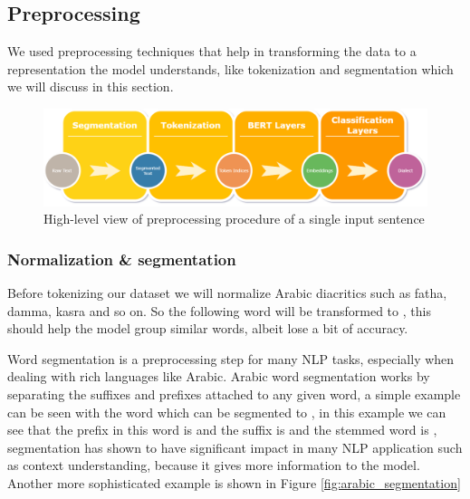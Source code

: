 \documentclass[12pt]{diazessay}
\begin{document}
        
        
            
            
            
        
        \subsection{Preprocessing}
        We used preprocessing techniques that help in transforming the data to a representation the model understands, like tokenization and segmentation which we will discuss in this section.
        
        \begin{figure}[h]
            \hskip-2.3cm
            \includegraphics[scale=0.4]{Figures/preprocessing_figure.png}
            \caption{High-level view of preprocessing procedure of a single input sentence}
            \label{fig:inference_figure}
        \end{figure}
        
            \subsubsection{Normalization \& segmentation}
            Before tokenizing our dataset we will normalize Arabic diacritics such as fatha, damma, kasra and so on. So the following word  
            will be transformed to , this should help the model group similar words, albeit lose a bit of accuracy.
            
            
            Word segmentation is a preprocessing step for many NLP tasks, especially when dealing with rich languages like Arabic. Arabic word segmentation works by separating the suffixes and prefixes attached to any given word, a simple example can be seen with the word  which can be segmented to , in this example we can see that the prefix in this word is  and the suffix is  and the stemmed word is , segmentation has shown to have signiﬁcant impact in many NLP application such as context understanding, because it gives more information to the model. Another more sophisticated example is shown in Figure \ref{fig:arabic_segmentation}
            
\end{document}
